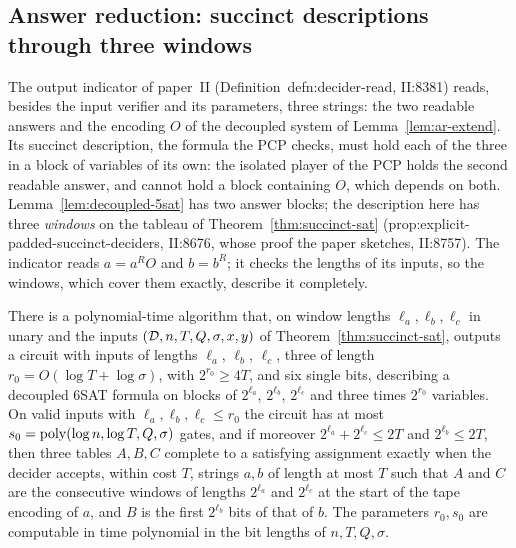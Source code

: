 \subsection{Answer reduction: succinct descriptions through three windows}

The output indicator of paper~II (Definition~defn:decider-read, II:8381) reads, besides the
input verifier and its parameters, three strings: the two readable answers and the encoding $O$
of the decoupled system of Lemma~\ref{lem:ar-extend}. Its succinct description, the formula the
PCP checks, must hold each of the three in a block of variables of its own: the isolated player
of the PCP holds the second readable answer, and cannot hold a block containing $O$, which
depends on both. Lemma~\ref{lem:decoupled-5sat} has two answer blocks; the description here has
three \emph{windows} on the tableau of Theorem~\ref{thm:succinct-sat}
(prop:explicit-padded-succinct-deciders, II:8676, whose proof the paper sketches, II:8757). The
indicator reads $a = a^R O$ and $b = b^R$; it checks the lengths of its inputs, so the windows,
which cover them exactly, describe it completely.

\begin{lemma}
\label{lem:ar-window-describer}
\leanok
There is a polynomial-time algorithm that, on window lengths $\ell_a, \ell_b, \ell_c$ in unary
and the inputs $(\mathcal{D}, n, T, Q, \sigma, x, y)$ of Theorem~\ref{thm:succinct-sat}, outputs a
circuit with inputs of lengths $\ell_a$, $\ell_b$, $\ell_c$, three of length
$r_0 = O(\log T + \log \sigma)$, with $2^{r_0} \geq 4T$, and six single bits, describing a
decoupled 6SAT formula on blocks of $2^{\ell_a}$, $2^{\ell_b}$, $2^{\ell_c}$ and three times
$2^{r_0}$ variables. On valid inputs with $\ell_a, \ell_b, \ell_c \le r_0$ the circuit has at
most $s_0 = \mathrm{poly}(\log n, \log T, Q, \sigma)$ gates, and if moreover $2^{\ell_a} + 2^{\ell_c}
\le 2T$ and $2^{\ell_b} \le 2T$, then three tables $A, B, C$ complete to a satisfying assignment
exactly when the decider accepts, within cost $T$, strings $a, b$ of length at most $T$ such that
$A$ and $C$ are the consecutive windows of lengths $2^{\ell_a}$ and $2^{\ell_c}$ at the start of
the tape encoding of $a$, and $B$ is the first $2^{\ell_b}$ bits of that of $b$. The parameters
$r_0, s_0$ are computable in time polynomial in the bit lengths of $n, T, Q, \sigma$.
\end{lemma}

